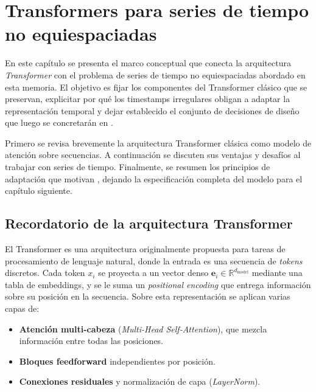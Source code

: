 \chapter{Transformers para series de tiempo no equiespaciadas}
\label{cap:transformers-series-tiempo}

En este capítulo se presenta el marco conceptual que conecta la arquitectura \textit{Transformer} con el problema de series de tiempo no equiespaciadas abordado en esta memoria. El objetivo es fijar los componentes del Transformer clásico que se preservan, explicitar por qué los timestamps irregulares obligan a adaptar la representación temporal y dejar establecido el conjunto de decisiones de diseño que luego se concretarán en \CTTransformer.

\hfill

Primero se revisa brevemente la arquitectura Transformer clásica como modelo de atención sobre secuencias. A continuación se discuten sus ventajas y desafíos al trabajar con series de tiempo. Finalmente, se resumen los principios de adaptación que motivan \CTTransformer, dejando la especificación completa del modelo para el capítulo siguiente.

\section{Recordatorio de la arquitectura Transformer}
\label{sec:transformer-clasico}

El Transformer \cite{vaswani2017attention} es una arquitectura originalmente propuesta para tareas de procesamiento de lenguaje natural, donde la entrada es una secuencia de \emph{tokens} discretos. Cada token $x_i$ se proyecta a un vector denso $\mathbf{e}_i \in \mathbb{R}^{d_{\text{model}}}$ mediante una tabla de embeddings, y se le suma un \emph{positional encoding} que entrega información sobre su posición en la secuencia. Sobre esta representación se aplican varias capas de:
\begin{itemize}
    \item \textbf{Atención multi-cabeza} (\emph{Multi-Head Self-Attention}), que mezcla información entre todas las posiciones.
    \item \textbf{Bloques feedforward} independientes por posición.
    \item \textbf{Conexiones residuales} y normalización de capa (\emph{LayerNorm}).
\end{itemize}

